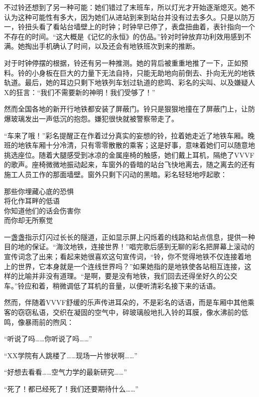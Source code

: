 不过铃还想到了另一种可能：她们错过了末班车，所以灯光才开始逐渐熄灭。她不认为这种可能性有多大，因为她们从进站到来到站台并没有过去多久。只是以防万一，铃扭头看了看站台墙壁上的时钟；时钟早已停了，表盘扭曲着，表针指向一个不存在的时间。“这大概是《记忆的永恒》的仿品。”铃对时钟放弃功利效用感到不满。她掏出手机确认了时间，以及还会有地铁班次到来的推断。

\begin{branch}
\badend 对于时钟停摆的根据，铃还有另一种推测。她的背后被重重地推了一下，正如预料。铃的小身板在巨大的力量下无法自持，只能无助地向前倒去、扑向无光的地铁轨道。最后，她的耳边只剩下地铁列车划过轨道的悲鸣、彩名的尖叫、以及嫌疑人X的狂言：“我们不需要新的神明！我们受够了！”

\gutend 然而全国各地的新开行地铁都安装了屏蔽门。铃只是狠狠地撞在了屏蔽门上，让防爆玻璃发出一声低沉的抱怨。嫌犯很快就被警察带走了。
\end{branch}

“车来了哦！”彩名提醒正在作着过分真实的妄想的铃，拉着她走近了地铁车厢。晚班的地铁车厢十分冷清，只有零零散散的乘客；这是好事，意味着她们可以随意地挑选座位。随着大腿感受到冰凉的金属座椅的触感，她们戴上耳机，隔绝了VVVF的歌声。座椅微微地振动起来，车窗外的昏暗的站台飞快地离去，随之离去的还有施工人员工作的那面墙壁。窗外只剩下闪动的黑暗。彩名轻轻地哼起歌：
\begin{song}
那些你埋藏心底的恐惧\\
将化作耳畔的低语\\
你知道他们的话会伤害你\\
而你却无所察觉
\end{song}

一盏盏指示灯闪过长长的隧道，正如显示屏上闪烁着的线路和站点信息，提供一种目的地的保证。“海汶地铁，连接世界！”唱完歌后感到无聊的彩名把屏幕上滚动的宣传词念了出来；看起来她很喜欢这句宣传词，“铃，你不觉得地铁不仅连接着地上的世界，它本身就是一个连线世界吗？”如果她指的是地铁使各站相互连接，这样的比喻并非没有道理。“是啊，要是没有地铁，我们回去还得坐好久的公交车。”铃应和着，稍微调低了耳机的音量，以便听清彩名接下来的话语。

然而，伴随着VVVF舒缓的乐声传进耳朵的，不是彩名的话语，而是车厢中其他乘客的窃窃私语，交织在凝固的空气中，碎玻璃般地扎入铃的耳膜，像水沸前的低鸣，像暴雨前的煦风：

“听说了吗……你听说了吗……”

“XX学院有人跳楼了……现场一片惨状啊……”

“好想去看看……空气力学的最新研究……”

“死了！都已经死了！我们还要期待什么……”

